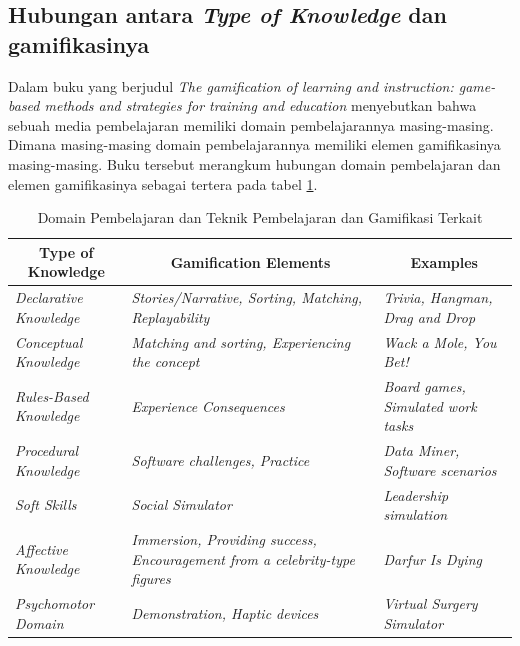 \subsection{Hubungan antara \textit{Type of Knowledge} dan gamifikasinya}
Dalam buku yang berjudul \textit{The gamification of learning and instruction: game-based methods and strategies for training and education} menyebutkan bahwa sebuah media pembelajaran memiliki domain pembelajarannya masing-masing.
Dimana masing-masing domain pembelajarannya memiliki elemen gamifikasinya masing-masing. Buku tersebut merangkum hubungan domain pembelajaran dan elemen gamifikasinya sebagai tertera pada tabel \ref*{Tab: Tabel Type of Knowledge and Gamification}.
 \begin{table}[H]
	\caption{Domain Pembelajaran dan Teknik Pembelajaran dan Gamifikasi Terkait \cite{kapp2012gamification}}
	\vspace{0.5em}
	\centering
	\begin{tabular}{|m{5cm}|m{5cm}|m{4cm}|}
		\hline
        \multicolumn{1}{|c|}{\textbf{Type of Knowledge}} & \multicolumn{1}{c|}{\textbf{Gamification Elements}} & \multicolumn{1}{c|}{\textbf{Examples}} \\ 
		\hline 
        \hline
		\textit{Declarative Knowledge} & \textit{Stories/Narrative, Sorting, Matching, Replayability} & \textit{Trivia, Hangman, Drag and Drop }\\\hline
		\textit{Conceptual Knowledge} & \textit{Matching and sorting, Experiencing the concept}  & \textit{Wack a Mole, You Bet!} \\\hline
		\textit{Rules-Based Knowledge}  & \textit{Experience Consequences}  & \textit{Board games, Simulated work tasks} \\ \hline
        \textit{Procedural Knowledge } & \textit{Software challenges, Practice} & \textit{Data Miner, Software scenarios} \\\hline
        \textit{Soft Skills} & \textit{Social Simulator}  & \textit{Leadership simulation}  \\\hline
        \textit{Affective Knowledge} & \textit{Immersion, Providing success, Encouragement from a celebrity-type figures } & \textit{Darfur Is Dying}  \\\hline
        \textit{Psychomotor Domain} & \textit{Demonstration, Haptic devices}  & \textit{Virtual Surgery Simulator}  \\
        \hline
	\end{tabular}
	\label{Tab: Tabel Type of Knowledge and Gamification}
\end{table}
